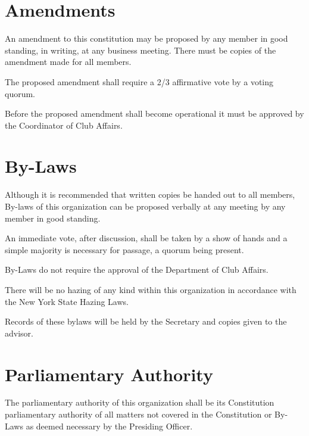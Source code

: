 \section{Amendments}
\begin{subroutines}
\item An amendment to this constitution may be proposed by any member in good standing, in writing, at any business meeting.  There must be copies of the amendment made for all members.
\item The proposed amendment shall require a 2/3 affirmative vote by a voting quorum.
\item Before the proposed amendment shall become operational it must be approved by the Coordinator of Club Affairs.
\end{subroutines}

\section{By-Laws}
\begin{subroutines}
\item Although it is recommended that written copies be handed out to all members, By-laws of this organization can be proposed verbally at any meeting by any member in good standing.
\item An immediate vote, after discussion, shall be taken by a show of hands and a simple majority is necessary for passage, a quorum being present.
\item By-Laws do not require the approval of the Department of Club Affairs.
\item There will be no hazing of any kind within this organization in accordance with the New York State Hazing Laws.
\item Records of these bylaws will be held by the Secretary and copies given to the advisor.
\end{subroutines}

\section{Parliamentary Authority}
\begin{subroutines}
\item The parliamentary authority of this organization shall be its Constitution parliamentary authority of all matters not covered in the Constitution or By-Laws as deemed necessary by the Presiding Officer.
\end{subroutines}

